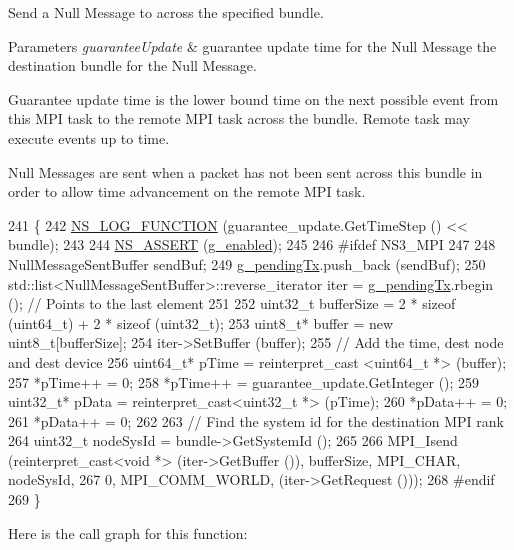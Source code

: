 Send a Null Message to across the specified bundle. 


\begin{DoxyParams}{Parameters}
{\em guarantee\+Update} & guarantee update time for the Null Message  the destination bundle for the Null Message.\\
\hline
\end{DoxyParams}
Guarantee update time is the lower bound time on the next possible event from this M\+PI task to the remote M\+PI task across the bundle. Remote task may execute events up to time.

Null Messages are sent when a packet has not been sent across this bundle in order to allow time advancement on the remote M\+PI task. 
\begin{DoxyCode}
241 \{
242   \hyperlink{log-macros-disabled_8h_a90b90d5bad1f39cb1b64923ea94c0761}{NS\_LOG\_FUNCTION} (guarantee\_update.GetTimeStep () << bundle);
243 
244   \hyperlink{assert_8h_a6dccdb0de9b252f60088ce281c49d052}{NS\_ASSERT} (\hyperlink{classns3_1_1NullMessageMpiInterface_ab4002d79e5319aae80e5bc39251ba609}{g\_enabled});
245 
246 \textcolor{preprocessor}{#ifdef NS3\_MPI}
247 
248   NullMessageSentBuffer sendBuf;
249   \hyperlink{classns3_1_1NullMessageMpiInterface_ad4d5d7c2c323bb4f225b7364f8b1c824}{g\_pendingTx}.push\_back (sendBuf);
250   std::list<NullMessageSentBuffer>::reverse\_iterator iter = \hyperlink{classns3_1_1NullMessageMpiInterface_ad4d5d7c2c323bb4f225b7364f8b1c824}{g\_pendingTx}.rbegin (); \textcolor{comment}{// Points to
       the last element}
251 
252   uint32\_t bufferSize = 2 * \textcolor{keyword}{sizeof} (uint64\_t) + 2 * \textcolor{keyword}{sizeof} (uint32\_t);
253   uint8\_t* buffer =  \textcolor{keyword}{new} uint8\_t[bufferSize];
254   iter->SetBuffer (buffer);
255   \textcolor{comment}{// Add the time, dest node and dest device}
256   uint64\_t* pTime = reinterpret\_cast <uint64\_t *> (buffer);
257   *pTime++ = 0;
258   *pTime++ = guarantee\_update.GetInteger ();
259   uint32\_t* pData = \textcolor{keyword}{reinterpret\_cast<}uint32\_t *\textcolor{keyword}{>} (pTime);
260   *pData++ = 0;
261   *pData++ = 0;
262 
263   \textcolor{comment}{// Find the system id for the destination MPI rank}
264   uint32\_t nodeSysId = bundle->GetSystemId ();
265 
266   MPI\_Isend (reinterpret\_cast<void *> (iter->GetBuffer ()), bufferSize, MPI\_CHAR, nodeSysId,
267              0, MPI\_COMM\_WORLD, (iter->GetRequest ()));
268 \textcolor{preprocessor}{#endif}
269 \}
\end{DoxyCode}


Here is the call graph for this function\+:





